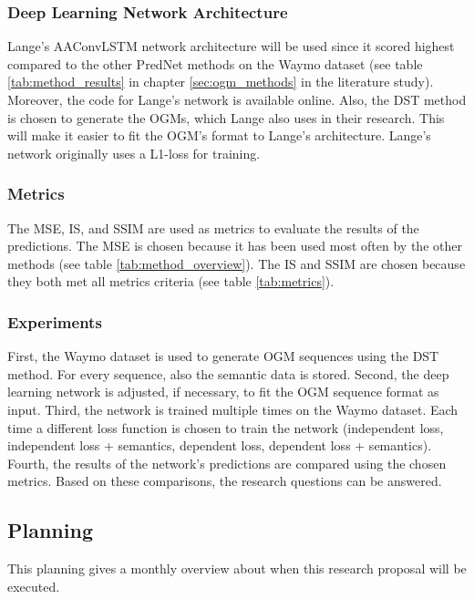 \subsubsection{Deep Learning Network Architecture} 
Lange's \cite{lange2020attention} \gls{AAConvLSTM} network architecture will be used since it scored highest compared to the other PredNet methods on the Waymo \cite{sun2020scalability} dataset (see table \ref{tab:method_results} in chapter \ref{sec:ogm_methods} in the literature study). Moreover, the code for Lange's \cite{lange2020attention} network is available online. Also, the \gls{DST} method is chosen to generate the \glspl{OGM}, which Lange also uses in their research. This will make it easier to fit the \gls{OGM}'s format to Lange's architecture. Lange's network originally uses a L1-loss for training.

\subsubsection{Metrics} 
The \gls{MSE}, \gls{IS}, and \gls{SSIM} are used as metrics to evaluate the results of the predictions. The \gls{MSE} is chosen because it has been used most often by the other methods (see table \ref{tab:method_overview}). The \gls{IS} and \gls{SSIM} are chosen because they both met all metrics criteria (see table \ref{tab:metrics}). 

\subsubsection{Experiments}
First, the Waymo \cite{sun2020scalability} dataset is used to generate \gls{OGM} sequences using the \gls{DST} method. For every sequence, also the semantic data is stored. Second, the deep learning network is adjusted, if necessary, to fit the \gls{OGM} sequence format as input. Third, the network is trained multiple times on the Waymo \cite{sun2020scalability} dataset. Each time a different loss function is chosen to train the network (independent loss, independent loss + semantics, dependent loss, dependent loss + semantics). Fourth, the results of the network's predictions are compared using the chosen metrics. Based on these comparisons, the research questions can be answered. 

\subsection{Planning} \label{subsec:rp_planning}
This planning gives a monthly overview about when this research proposal will be executed. 


